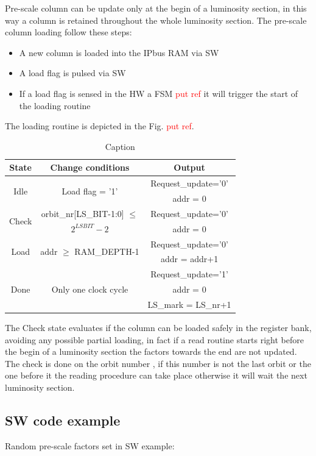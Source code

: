 \documentclass[a4paper,11pt]{article}
\begin{document}
Pre-scale column can be update only at the begin of a luminosity section, in this way a column is retained throughout the whole luminosity section. 
The pre-scale column loading follow these steps:
\begin{itemize}
    \item A new column is loaded into the IPbus RAM via SW
    \item A load flag is pulsed via SW
    \item If a load flag is sensed in the HW a FSM \textcolor{red}{put ref} it will trigger the start of the loading routine
\end{itemize}
The loading routine is depicted in the Fig. \textcolor{red}{put ref}.
\begin{table}[]
    \centering
    \begin{tabular}{c|c|c}
        State & Change conditions & Output \\
        \hline
        \multirow{2}{*}{Idle}  & \multirow{2}{*}{Load flag = '1'} & Request\_update='0' \\
        && addr = 0 \\
        \multirow{2}{*}{Check} & orbit\_nr[LS\_BIT-1:0] $\leq$ & Request\_update='0' \\
        & $2^{LSBIT}-2$ & addr = 0 \\
        \multirow{2}{*}{Load} & \multirow{2}{*}{addr $\geq$ RAM\_DEPTH-1} & Request\_update='0' \\
        && addr = addr+1 \\
        \multirow{3}{*}{Done} & \multirow{3}{*}{Only one clock cycle} & Request\_update='1' \\
        && addr = 0 \\
        && LS\_mark = LS\_nr+1 \\
    \end{tabular}
    \caption{Caption}
    \label{tab:my_label}
\end{table}
The Check state evaluates if the column can be loaded safely in the register bank, avoiding any possible partial loading, in fact if a read routine starts right before the begin of a luminosity section the factors towards the end are not updated. The check is done on the orbit number , if this number is not the last orbit or the one before it the reading procedure can take place otherwise it will wait the next luminosity section. 

\subsection{SW code example}
Random pre-scale factors set in SW example:
\end{document}
